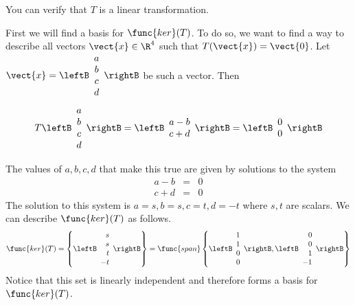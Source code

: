\begin{solution}
You can verify that $T$ is a linear transformation.

First we will find a basis for $\func{ker}(T)$. To do so, we want to find a way to describe all vectors $\vect{x} \in \R^4$ such that $T(\vect{x}) = \vect{0}$. Let $\vect{x} =  \leftB \begin{array}{c}
a \\
b \\
c \\
d
\end{array} \rightB$ be such a vector. Then
\[
T \leftB \begin{array}{c}
a \\
b \\
c \\
d
\end{array} \rightB = 
\leftB \begin{array}{c}
a - b \\ 
c + d
\end{array} \rightB = 
\leftB \begin{array}{c}
0 \\ 
0
\end{array} \rightB
\]

The values of $a, b, c, d$ that make this true are given by solutions to the system 
\begin{eqnarray*}
a - b &=& 0 \\
c + d &=& 0
\end{eqnarray*}
The solution to this system is $ a = s, b = s, c = t, d = -t$ where $s, t$ are scalars. We can describe $\func{ker}(T)$ as follows.
\[
\func{ker}(T) = \left\{ \leftB \begin{array}{r}
s \\ 
s \\
t \\
-t 
\end{array} \rightB \right\}
=
\func{span} \left\{ \leftB \begin{array}{r}
1 \\
1 \\
0 \\
0 
\end{array} \rightB, \leftB \begin{array}{r}
0 \\
0 \\
1 \\
-1
\end{array} \rightB \right\}
\]
Notice that this set is linearly independent and therefore forms a basis for $\func{ker}(T)$. 


\end{solution}
